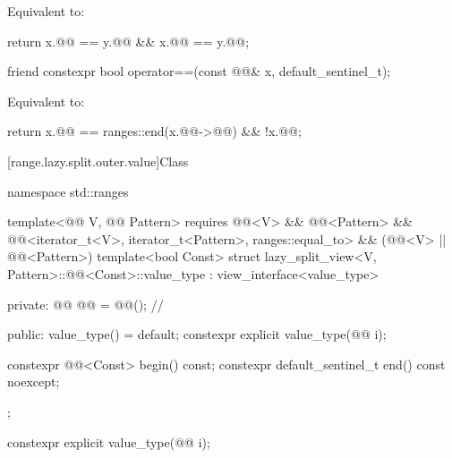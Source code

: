 \begin{itemdescr}
\pnum
\effects
Equivalent to:
\begin{codeblock}
return x.@@ == y.@@ && x.@@ == y.@@;
\end{codeblock}
\end{itemdescr}

%
\begin{itemdecl}
friend constexpr bool operator==(const @@& x, default_sentinel_t);
\end{itemdecl}

\begin{itemdescr}
\pnum
\effects
Equivalent to:
\begin{codeblock}
return x.@@ == ranges::end(x.@@->@@) && !x.@@;
\end{codeblock}
\end{itemdescr}

[range.lazy.split.outer.value]{Class }

%
\begin{codeblock}
namespace std::ranges {
  template<@@ V, @@ Pattern>
    requires @@<V> && @@<Pattern> &&
             @@<iterator_t<V>, iterator_t<Pattern>, ranges::equal_to> &&
             (@@<V> || @@<Pattern>)
  template<bool Const>
  struct lazy_split_view<V, Pattern>::@@<Const>::value_type
    : view_interface<value_type> {
  private:
    @@ @@ = @@();               // \expos

  public:
    value_type() = default;
    constexpr explicit value_type(@@ i);

    constexpr @@<Const> begin() const;
    constexpr default_sentinel_t end() const noexcept;
  };
}
\end{codeblock}

%
\begin{itemdecl}
constexpr explicit value_type(@@ i);
\end{itemdecl}

